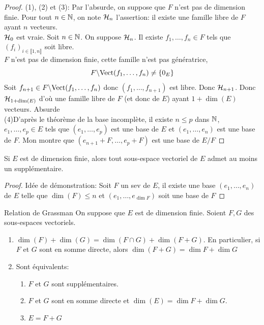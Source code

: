 \documentclass[]{report}
\begin{document}
\begin{proof}
    (1), (2) et (3): Par l'absurde, on suppose que $F$ n'est pas de dimension finie. Pour tout $n\in \mathbb{N}$, on note $\mathcal{H}_n$ l'assertion: il existe une famille libre de $F$ ayant $n$ vecteurs.\\
    $\mathcal{H}_0$ est vraie. Soit $n\in \mathbb{N}$. On suppose $\mathcal{H}_n$. Il existe $f_1,\ldots,f_n\in F$ tels que $(f_i)_{i\in \llbracket 1,n\rrbracket}$ soit libre.\\
    $F$ n'est pas de dimension finie, cette famille n'est pas génératrice,
    \[F\backslash \text{Vect} (f_1,\ldots, f_n)\neq \{0_E\}\]
    Soit $f_{n+1}\in F\backslash \text{Vect} (f_1,\ldots, f_n)$ donc $(f_1,\ldots,f_{n+1})$ est libre. Donc $\mathcal{H}_{n+1}$. Donc $\mathcal{H}_{1+\dim(E)}$ d'où une famille libre de $F$ (et donc de $E$) ayant $1+\dim(E)$ vecteurs. Absurde\\
    (4)D'après le théorème de la base incomplète, il existe $n\le p$ dans $\mathbb{N}$, $e_1,\ldots,e_p \in E$ tels que  $(e_1,\ldots,e_p)$ est une base de $E$ et $(e_1,\ldots,e_n)$ est une base de $F$. Mon montre que $(e_{n+1}+F,\ldots, e_p+F)$ est une base de $E/F$
\end{proof}

\begin{tm}{}{}
    Si $E$ est de dimension finie, alors tout sous-espace vectoriel de $E$ admet au moins un supplémentaire.
\end{tm}

\begin{proof}
    Idée de démonstration: Soit $F$ un sev de $E$, il existe une base $(e_1,\ldots,e_n)$ de $E$ telle que $\dim(F)\le n$ et $(e_1,\ldots,e_{\dim F})$ soit une base de $F$
\end{proof}

\begin{tm}{Relation de Grassman}{}
    On suppose que $E$ est de dimension finie. Soient $F,G$ des sous-espaces vectoriels.
    \begin{enumerate}
        \item $\dim(F)+\dim (G)=\dim(F\cap G)+\dim(F+G)$. En particulier, si $F$ et $G$ sont en somme directe, alors $\dim(F+G)=\dim F+ \dim G$
        \item Sont équivalents:
        \begin{enumerate}
            \item $F$ et $G$ sont supplémentaires.
            \item $F$ et $G$ sont en somme directe et $\dim (E)=\dim F+\dim G$.
            \item $E=F+G$
        \end{enumerate}
    \end{enumerate}
\end{tm}
\end{document}
